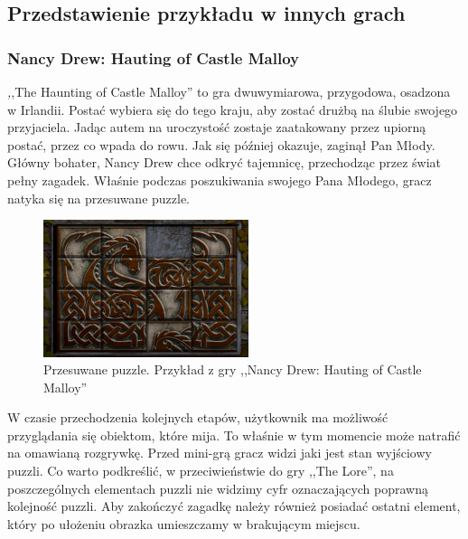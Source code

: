 \documentclass[oneside,polski,logo]{amuthesis}
\begin{document}
\subsection{Przedstawienie przykładu w innych grach}
\subsubsection{Nancy Drew: Hauting of Castle Malloy}
\par \emph ,,The Haunting of Castle Malloy'' to gra dwuwymiarowa, przygodowa, osadzona w Irlandii. Postać wybiera się do tego kraju, aby zostać drużbą na ślubie swojego przyjaciela. Jadąc autem na uroczystość zostaje zaatakowany przez upiorną postać, przez co wpada do rowu. Jak się później okazuje, zaginął Pan Młody. Główny bohater, Nancy Drew chce odkryć tajemnicę, przechodząc przez świat pełny zagadek. Właśnie podczas poszukiwania swojego Pana Młodego, gracz natyka się na przesuwane puzzle. 
\begin{figure}[h]
	\centering
	\includegraphics[width=6cm]{images/tyrek/nd.png}
	\caption{Przesuwane puzzle. Przykład z gry ,,Nancy Drew: Hauting of Castle Malloy''}
\end{figure}

W czasie przechodzenia kolejnych etapów, użytkownik ma możliwość przyglądania się obiektom, które mija. To właśnie w tym momencie może natrafić na omawianą rozgrywkę. Przed mini-grą gracz widzi jaki jest stan wyjściowy puzzli. Co warto podkreślić, w przeciwieństwie do gry ,,The Lore'', na poszczególnych elementach puzzli nie widzimy cyfr oznaczających poprawną kolejność puzzli. Aby zakończyć zagadkę należy również posiadać ostatni element, który po ułożeniu obrazka umieszczamy w brakującym miejscu. \cite{nd}
\end{document}
